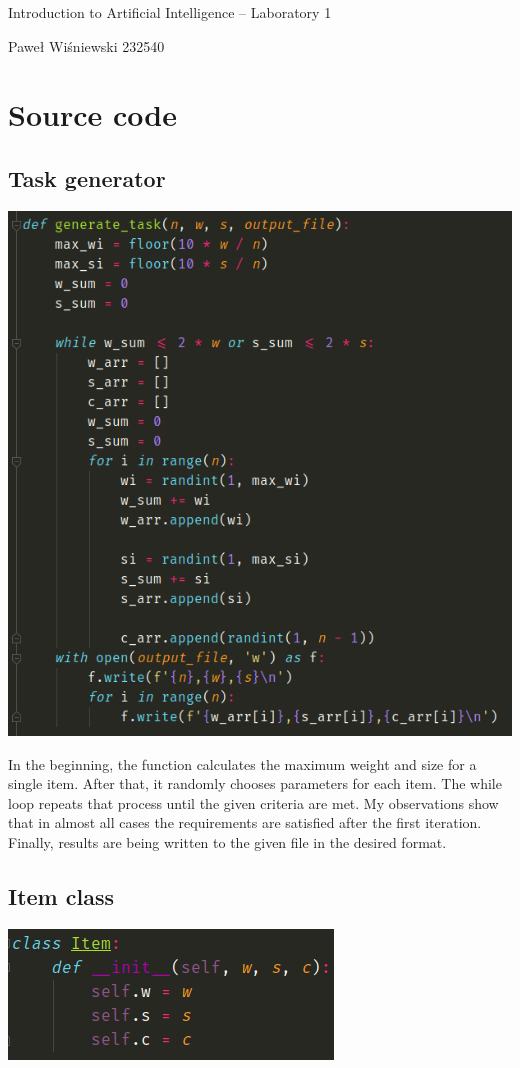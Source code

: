 \documentclass[12pt]{article}
\begin{document}
\begin{center}
Introduction to Artificial Intelligence – Laboratory 1

Paweł Wiśniewski 232540
\end{center}

\section{Source code}

\subsection{Task generator}
\begin{center}
	\includegraphics[scale=0.5]{gentask}
\end{center}

In the beginning, the function calculates the maximum weight and size for a single item.
After that, it randomly chooses parameters for each item. The while loop repeats that process until the given criteria are met.
My observations show that in almost all cases the requirements are satisfied after the first iteration.
Finally, results are being written to the given file in the desired format.


\subsection{Item class}
\begin{center}
	\includegraphics[scale=0.5]{item}
\end{center}
\end{document}
